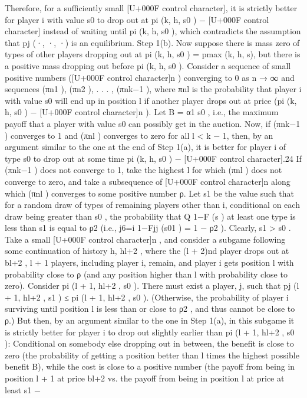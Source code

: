 \documentclass[10pt]{article}
\begin{document}
\begin{ReviewVerbatim}
Therefore, for a sufficiently small [U+000F control character], it is strictly better for player i with value s0 to drop out at
pi (k, h, s0 ) − [U+000F control character] instead of waiting until pi (k, h, s0 ), which contradicts the assumption that {pj (·, ·, ·)}
is an equilibrium.
Step 1(b). Now suppose there is mass zero of types of other players dropping out at pi (k, h, s0 ) =
pmax (k, h, s), but there is a positive mass dropping out before pi (k, h, s0 ). Consider a sequence of
small positive numbers ([U+000F control character]n ) converging to 0 as n → ∞ and sequences (πn1 ), (πn2 ), . . . , (πnk−1 ), where
πnl is the probability that player i with value s0 will end up in position l if another player drops
out at price (pi (k, h, s0 ) − [U+000F control character]n ). Let B = α1 s0 , i.e., the maximum payoff that a player with value s0
can possibly get in the auction. Now, if (πnk−1 ) converges to 1 and (πnl ) converges to zero for all
l < k − 1, then, by an argument similar to the one at the end of Step 1(a), it is better for player
i of type s0 to drop out at some time pi (k, h, s0 ) − [U+000F control character].24 If (πnk−1 ) does not converge to 1, take the
highest l for which (πnl ) does not converge to zero, and take a subsequence of [U+000F control character]n along which (πnl )
converges to some positive number ρ. Let s1 be the value such that for a random draw of types of
remaining players other than i, conditional on each draw being greater than s0 , the probability that
Q
1−F (s )
at least one type is less than s1 is equal to ρ2 (i.e., j6=i 1−Fjj (s01 ) = 1 − ρ2 ). Clearly, s1 > s0 . Take a
small [U+000F control character]n , and consider a subgame following some continuation of history h, hl+2 , where the (l + 2)nd
player drops out at bl+2 , l + 1 players, including player i, remain, and player i gets position l with
probability close to ρ (and any position higher than l with probability close to zero). Consider
pi (l + 1, hl+2 , s0 ). There must exist a player, j, such that pj (l + 1, hl+2 , s1 ) ≤ pi (l + 1, hl+2 , s0 ).
(Otherwise, the probability of player i surviving until position l is less than or close to ρ2 , and thus
cannot be close to ρ.) But then, by an argument similar to the one in Step 1(a), in this subgame
it is strictly better for player i to drop out slightly earlier than pi (l + 1, hl+2 , s0 ): Conditional on
somebody else dropping out in between, the benefit is close to zero (the probability of getting a
position better than l times the highest possible benefit B), while the cost is close to a positive
number (the payoff from being in position l + 1 at price bl+2 vs. the payoff from being in position
l at price at least s1 −


\end{ReviewVerbatim}
\end{document}
